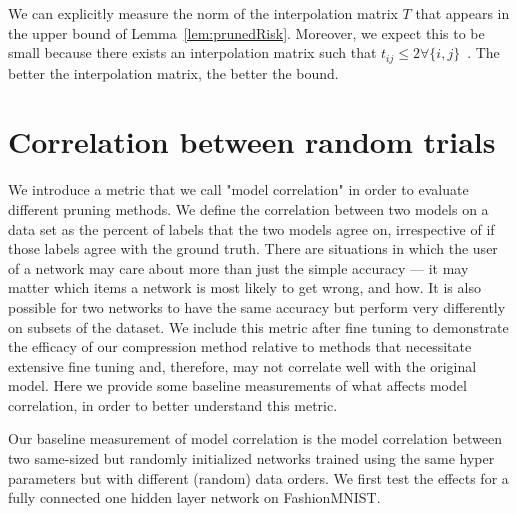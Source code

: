 \begin{remarks}
We can explicitly measure the norm of the interpolation matrix $T$ that appears in the upper bound of Lemma~\ref{lem:prunedRisk}.  Moreover, we expect this to be small because there exists an interpolation matrix such that  $t_{ij} \leq 2 \forall \{i,j\}$~\cite{liberty2007randomized}. The better the interpolation matrix, the better the bound.    
\end{remarks}





\section{Correlation between random trials}
\label{app:sec:correlation}
We introduce a metric that we call "model correlation" in order to evaluate different pruning methods.  We define the correlation between two models on a data set as the percent of labels that the two models agree on, irrespective of if those labels agree with the ground truth.  There are situations in which the user of a network may care about more than just the simple accuracy --- it may matter which items a network is most likely to get wrong, and how.  It is also possible for two networks to have the same accuracy but perform very differently on subsets of the dataset.  We include this metric after fine tuning to demonstrate the efficacy of our compression method relative to methods that necessitate extensive fine tuning and, therefore, may not correlate well with the original model.  Here we provide some baseline measurements of what affects model correlation, in order to better understand this metric.  

Our baseline measurement of model correlation is the model correlation between two same-sized but randomly initialized networks trained using the same hyper parameters but with different (random) data orders.  We first test the effects for a fully connected one hidden layer network on FashionMNIST. 

